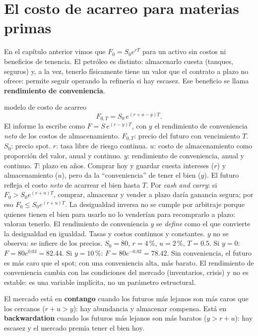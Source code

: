 \section{El costo de acarreo para materias primas}

En el capítulo anterior vimos que $F_0=S_0e^{rT}$ para un activo sin costos ni beneficios de tenencia. El petróleo es distinto: almacenarlo cuesta (tanques, seguros) y, a la vez, tenerlo físicamente tiene un valor que el contrato a plazo no ofrece: permite seguir operando la refinería si hay escasez. Ese beneficio se llama \textbf{rendimiento de conveniencia}.

\begin{ficha}{modelo de costo de acarreo}
\[ F_{0,T}=S_0\,e^{(r+u-y)T}. \]
El informe la escribe como $F=S\,e^{(r-y)T}$, con $y$ el rendimiento de conveniencia \emph{neto} de los costos de almacenamiento.
 $F_{0,T}$: precio del futuro con vencimiento $T$. $S_0$: precio spot. $r$: tasa libre de riesgo continua. $u$: costo de almacenamiento como proporción del valor, anual y continuo. $y$: rendimiento de conveniencia, anual y continuo. $T$: plazo en años.
 Comprar hoy y guardar cuesta intereses ($r$) y almacenamiento ($u$), pero da la \enquote{conveniencia} de tener el bien ($y$). El futuro refleja el costo \emph{neto} de acarrear el bien hasta $T$.
 Por \emph{cash and carry}: si $F_0>S_0e^{(r+u)T}$, comprar, almacenar y vender a plazo daría ganancia segura; por eso $F_0\le S_0e^{(r+u)T}$. La desigualdad inversa no se cumple por arbitraje porque quienes tienen el bien para usarlo no lo venderían para recomprarlo a plazo: valoran tenerlo. El rendimiento de conveniencia $y$ se \emph{define} como el que convierte la desigualdad en igualdad.
 Tasas y costos continuos y constantes. $y$ no se observa: se infiere de los precios.
 $S_0=80$, $r=4\,\%$, $u=2\,\%$, $T=0.5$. Si $y=0$: $F=80e^{0.03}=82.44$. Si $y=10\,\%$: $F=80e^{-0.02}=78.42$.
 Sin conveniencia, el futuro es más caro que el spot; con una conveniencia alta, más barato.
 El rendimiento de conveniencia cambia con las condiciones del mercado (inventarios, crisis) y no es estable: es una variable implícita, no un parámetro estructural.
\end{ficha}

\begin{definicion}
El mercado está en \textbf{contango} cuando los futuros más lejanos son más caros que los cercanos ($r+u>y$): hay abundancia y almacenar compensa. Está en \textbf{backwardation} cuando los futuros más lejanos son más baratos ($y>r+u$): hay escasez y el mercado premia tener el bien hoy.
\end{definicion}

